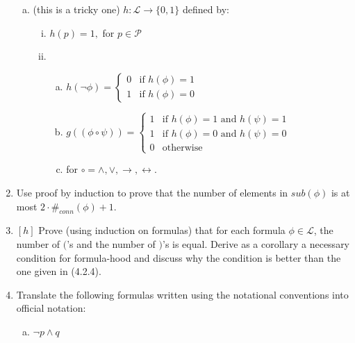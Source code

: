 \begin{enumerate}[\thesection.1]
\begin{enumerate}[(a)]
					\item (this is a tricky one) $h:\mathcal{L}\to\{0,1\}$ defined by:
				
					\begin{enumerate}[(i)]

					\item $h(p)=1,$ for $p\in\mathcal{P}$

					\item 			\begin{enumerate}[(a)]

					\item $h(\neg \phi)=\begin{cases}
					0 &\text{if }h(\phi)=1\\
					1 & \text{if }h(\phi)=0
					\end{cases}$

					\item $g((\phi\circ \psi))=\begin{cases}
					1&\text{if }h(\phi)=1\text{ and }h(\psi)=1\\
					1&\text{if }h(\phi)=0\text{ and }h(\psi)=0\\
					0 & \text{otherwise}
					\end{cases}$ 
					
					\item[] for $\circ=\land,\lor,\to,\leftrightarrow.$
					
					\end{enumerate}
					\end{enumerate}
			
			\end{enumerate} 
		
		\item Use proof by induction to prove that the number of elements in $sub(\phi)$ is at most $2\cdot \#_{conn}(\phi)+1$.

		\item $[h]$ Prove (using induction on formulas) that for each formula $\phi\in\mathcal{L}$, the number of $($'s and the number of $)$'s is equal. Derive as a corollary a necessary condition for formula-hood and discuss why the condition is better than the one given in (4.2.4).
		
		\item Translate the following formulas written using the notational conventions into official notation:
		
		\begin{enumerate}[(a)]

		\item  $\neg p\land q$


\end{enumerate}
\end{enumerate}
